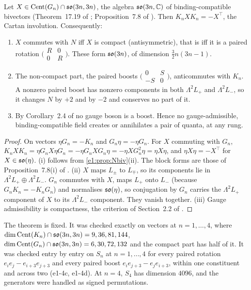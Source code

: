 \begin{theorem}
\label{e1:thm:Nrule}
Let $X\in\operatorname{Cent}(G_n)\cap\mathfrak{so}(3n,3n)$, the algebra $\mathfrak{so}(3n,\mathbb{C})$ of binding-compatible bivectors (Theorem~17.19 of \cite{ES17}; Proposition~7.8 of
\cite{RE}). Then $K_nXK_n=-X^{\!\top}$, the Cartan involution. Consequently:
\begin{enumerate}[label=(\roman*),leftmargin=2.2em]
\item $X$ commutes with $N$ iff $X$ is compact (antisymmetric), that is iff it is a paired rotation $\bigl(\begin{smallmatrix}R&0\\0&R\end{smallmatrix}\bigr)$.
These form $\mathfrak{so}(3n)$, of dimension $\tfrac32n(3n-1)$.
\item The non-compact part, the paired boosts $\bigl(\begin{smallmatrix}0&S\\-S&0\end{smallmatrix}\bigr)$, anticommutes with $K_n$. A nonzero paired
boost has nonzero components in both $\Lambda^2L_+$ and $\Lambda^2L_-$, so it changes $N$ by $+2$ and by $-2$ and conserves no part of it.
\item By Corollary~2.4 of \cite{ES17} no gauge boson is a boost. Hence no gauge-admissible, binding-compatible field creates or annihilates a
pair of quanta, at any rung.
\end{enumerate}
\end{theorem}

\begin{proof}
On vectors $\eta G_n=-K_n$ and $G_n\eta=-\eta G_n$. For $X$ commuting with $G_n$,
$K_nXK_n=\eta G_nX\eta G_n=-\eta G_nXG_n\eta=-\eta XG_n^2\eta=\eta X\eta$, and $\eta X\eta=-X^{\!\top}$ for $X\in\mathfrak{so}(\eta)$. (i) follows from \cref{e1:prop:Nbiv}(ii). The block
forms are those of Proposition~7.8(i) of \cite{RE}. (ii) $X$ maps $L_\pm$ to $L_\mp$, so its components lie in $\Lambda^2L_+\oplus\Lambda^2L_-$.
$G_n$ commutes with $X$, maps $L_+$ onto $L_-$ (because $G_nK_n=-K_nG_n$) and normalises $\mathfrak{so}(\eta)$, so conjugation by $G_n$ carries the $\Lambda^2L_+$
component of $X$ to its $\Lambda^2L_-$ component. They vanish together. (iii) Gauge admissibility is compactness, the criterion of
Section~2.2 of \cite{ES17}.
\end{proof}

The theorem is fixed. It was checked exactly on vectors at $n=1,\dots,4$, where $\dim\operatorname{Cent}(K_n)\cap\mathfrak{so}(3n,3n)=9,36,81,144$,
$\dim\operatorname{Cent}(G_n)\cap\mathfrak{so}(3n,3n)=6,30,72,132$ and the compact part has half of it. It was checked entry by entry on $S_n$ at $n=1,\dots,4$ for every
paired rotation $e_ie_j-e_{i+3}e_{j+3}$ and every paired boost $e_ie_{j+3}-e_je_{i+3}$, within one constituent and across two (e1-4c,
e1-4d). At $n=4$, $S_4$ has dimension $4096$, and the generators were handled as signed permutations.

